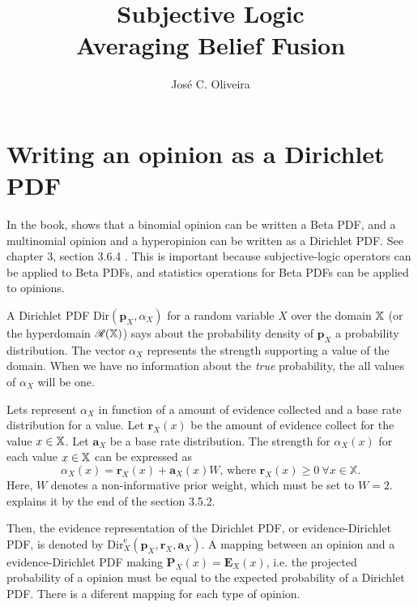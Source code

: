 \documentclass[a4paper,12pt]{article}
\title{Subjective Logic\\
\large{Averaging Belief Fusion}}
\author{José C. Oliveira}
\theoremstyle{definition}
\theoremstyle{theorem}
\numberwithin{equation}{section}
\begin{document}
\maketitle

\section{Writing an opinion as a Dirichlet PDF}

In the book, \citeauthor{josang2016subjective} shows that a binomial opinion can be written a Beta PDF, and a multinomial opinion and a hyperopinion can be written as a Dirichlet PDF. See chapter 3, section 3.6.4 \cite{josang2016subjective}. This is important because subjective-logic operators can be applied to Beta PDFs, and statistics operations for Beta PDFs can be applied to opinions.

A Dirichlet PDF $\mathrm{Dir}(\mathbf{p}_X, \alpha_X)$ for a random variable $X$ over the domain $\mathbb{X}$ (or the hyperdomain $\mathcal{R}(\mathbb{X})$)  says about the probability density of $\mathbf{p}_X$  a probability distribution. The vector $\alpha_X$ represents the strength supporting a value of the domain. When we have no information about the \emph{true} probability, the all values of $\alpha_X$ will be one.

Lets represent $\alpha_X$ in function of a amount of evidence collected and a base rate distribution for a value. Let $\mathbf{r}_X(x)$ be the amount of evidence collect for the value $x \in \mathbb{X}$. Let $\mathbf{a}_X$ be a base rate distribution. The strength for $\alpha_X(x)$ for each value $x \in \mathbb{X}$ can be expressed as
\begin{equation}\label{eq:alpha_as_evidence_and_base_rate}
    \alpha_X(x) = \mathbf{r}_X(x) + \mathbf{a}_X(x)W\text{, where }\mathbf{r}_X(x) \geq 0\ \forall x \in \mathbb{X}\text{.}
\end{equation}
Here, $W$ denotes a non-informative prior weight, which must be set to $W = 2$. \citeauthor{josang2016subjective} explains it by the end of the section 3.5.2.

Then, the evidence representation of the Dirichlet PDF, or evidence-Dirichlet PDF, is denoted by $\mathrm{Dir}^{\mathrm{e}}_X(\mathbf{p}_X, \mathbf{r}_X, \mathbf{a}_X)$. A mapping between an opinion and a evidence-Dirichlet PDF making $\mathbf{P}_X(x) = \mathbf{E}_X(x)$, i.e. the projected probability of a opinion must be equal to the expected probability of a Dirichlet PDF. There is a diferent mapping for each type of opinion.
\end{document}
